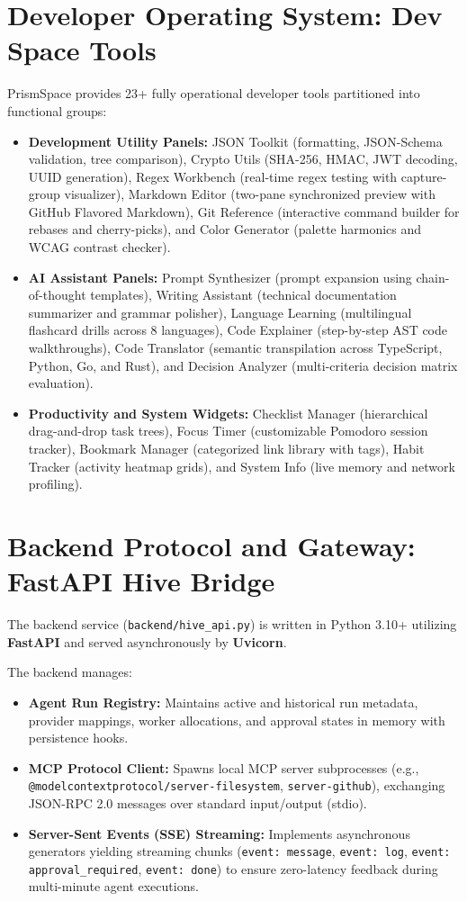 \documentclass[12pt,a4paper]{report}
\begin{document}
\section{Developer Operating System: Dev Space Tools}
PrismSpace provides 23+ fully operational developer tools partitioned into functional groups:
\begin{itemize}
    \item \textbf{Development Utility Panels:} JSON Toolkit (formatting, JSON-Schema validation, tree comparison), Crypto Utils (SHA-256, HMAC, JWT decoding, UUID generation), Regex Workbench (real-time regex testing with capture-group visualizer), Markdown Editor (two-pane synchronized preview with GitHub Flavored Markdown), Git Reference (interactive command builder for rebases and cherry-picks), and Color Generator (palette harmonics and WCAG contrast checker).
    \item \textbf{AI Assistant Panels:} Prompt Synthesizer (prompt expansion using chain-of-thought templates), Writing Assistant (technical documentation summarizer and grammar polisher), Language Learning (multilingual flashcard drills across 8 languages), Code Explainer (step-by-step AST code walkthroughs), Code Translator (semantic transpilation across TypeScript, Python, Go, and Rust), and Decision Analyzer (multi-criteria decision matrix evaluation).
    \item \textbf{Productivity and System Widgets:} Checklist Manager (hierarchical drag-and-drop task trees), Focus Timer (customizable Pomodoro session tracker), Bookmark Manager (categorized link library with tags), Habit Tracker (activity heatmap grids), and System Info (live memory and network profiling).
\end{itemize}

\section{Backend Protocol and Gateway: FastAPI Hive Bridge}
The backend service (\texttt{backend/hive\_api.py}) is written in Python 3.10+ utilizing \textbf{FastAPI} and served asynchronously by \textbf{Uvicorn}.

The backend manages:
\begin{itemize}
    \item \textbf{Agent Run Registry:} Maintains active and historical run metadata, provider mappings, worker allocations, and approval states in memory with persistence hooks.
    \item \textbf{MCP Protocol Client:} Spawns local MCP server subprocesses (e.g., \texttt{@modelcontextprotocol/server-filesystem}, \texttt{server-github}), exchanging JSON-RPC 2.0 messages over standard input/output (stdio).
    \item \textbf{Server-Sent Events (SSE) Streaming:} Implements asynchronous generators yielding streaming chunks (\texttt{event: message}, \texttt{event: log}, \texttt{event: approval\_required}, \texttt{event: done}) to ensure zero-latency feedback during multi-minute agent executions.
\end{itemize}
\end{document}
